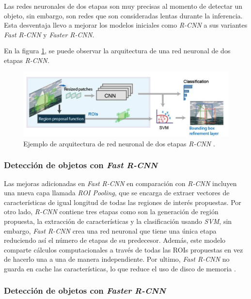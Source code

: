 Las redes neuronales de dos etapas son muy precisas al momento de detectar un objeto, sin embargo, son redes que son consideradas lentas durante la inferencia. Esta desventaja llevo a mejorar los modelos iniciales como \textit{R-CNN} a sus variantes \textit{Fast R-CNN} y \textit{Faster R-CNN}.

En la figura \ref{fig:rcnn}, se puede observar la arquitectura de una red neuronal de dos etapas \textit{R-CNN}.

\begin{figure}[ht]
	\centering
	\includegraphics[scale=.25]{./Figures/R-CNN.png}
	\caption{Ejemplo de arquitectura de red neuronal de dos etapas \textit{R-CNN} \cite{WEBSITE:6}.}
	\label{fig:rcnn}
\end{figure}

\subsubsection{Detección de objetos con \textit{Fast R-CNN}}

Las mejoras adicionadas en \textit{Fast R-CNN} en comparación con \textit{R-CNN} incluyen una nueva capa llamada \textit{ROI Pooling}, que se encarga de extraer vectores de características de igual longitud de todas las regiones de interés propuestas. Por otro lado, \textit{R-CNN} contiene tres etapas como son la generación de región propuesta, la extracción de características y la clasificación usando \textit{SVM}, sin embargo, \textit{Fast R-CNN} crea una red neuronal que tiene una única etapa reduciendo así el número de etapas de su predecesor. Además, este modelo comparte cálculos computacionales a través de todas las ROIs propuestas en vez de hacerlo una a una de manera independiente. Por ultimo, \textit{Fast R-CNN} no guarda en cache las características, lo que reduce el uso de disco de memoria \cite{ARTICLE:10}.

\subsubsection{Detección de objetos con \textit{Faster R-CNN}}

